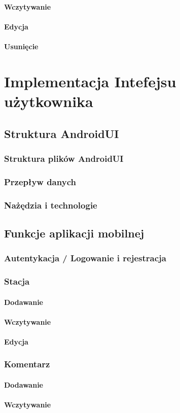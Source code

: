 \paragraph{Wczytywanie}
\paragraph{Edycja}
\paragraph{Usunięcie}
%
\section{Implementacja Intefejsu użytkownika}
\subsection{Struktura AndroidUI}
\subsubsection{Struktura plików AndroidUI}
\subsubsection{Przepływ danych}
\subsubsection{Nażędzia i technologie}
\subsection{Funkcje aplikacji mobilnej}
\subsubsection{Autentykacja / Logowanie i rejestracja}
\subsubsection{Stacja}
\paragraph{Dodawanie}
\paragraph{Wczytywanie}
\paragraph{Edycja}
\subsubsection{Komentarz}
\paragraph{Dodawanie}
\paragraph{Wczytywanie}

